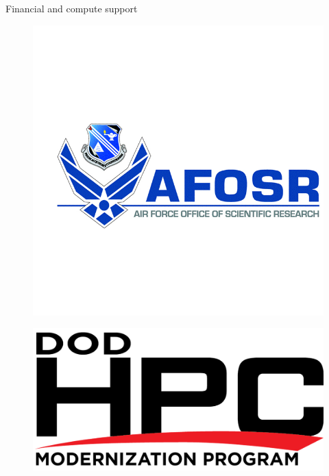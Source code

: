 \documentclass[]{beamer}
\begin{document}
\begin{frame}{Financial and compute support}
\begin{minipage}{0.34\linewidth}
\begin{figure}
			\includegraphics[width=0.99\linewidth,trim={2cm 3cm 0em 3cm},clip]{back_matter/afosr.jpg}
		\end{figure}
	\end{minipage}
	\begin{minipage}{0.23\linewidth}
		\begin{figure}
			\includegraphics[width=0.99\linewidth]{back_matter/hpcmp.png}
		\end{figure}
	\end{minipage}
	\begin{minipage}{0.23\linewidth}
		\begin{figure}

\end{figure}
\end{minipage}
\end{frame}
\end{document}
